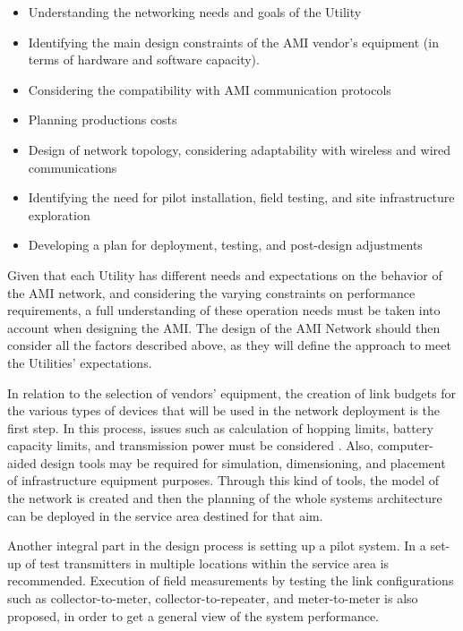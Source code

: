 \documentclass[11pt,draftclsnofoot,onecolumn]{IEEEtran}
\begin{document}
\begin{itemize}
\item Understanding the networking needs and goals of the Utility
\item Identifying the main design constraints of the AMI vendor's equipment (in terms of hardware and software capacity).
\item Considering the compatibility with AMI communication protocols
\item Planning productions costs
\item Design of network topology, considering adaptability with wireless and wired communications
\item Identifying the need for pilot installation, field testing, and site infrastructure exploration
\item Developing a plan for deployment, testing, and post-design adjustments


\end{itemize}
		
Given that each Utility has different needs and expectations on the behavior of the AMI network, and considering the varying constraints on performance requirements, a full understanding of these operation needs must be taken into account when designing the AMI. The design of the AMI Network should then consider all the factors described above, as they will define the approach to meet the Utilities' expectations.

In relation to the selection of vendors' equipment, the creation of link budgets for the various types of devices that will be used in the network deployment is the first step. In this process, issues such as calculation of hopping limits, battery capacity limits, and transmission power must be considered \cite{Leon2011}. Also, computer-aided design tools may be required for simulation, dimensioning, and placement of infrastructure equipment purposes.  Through this kind of tools, the model of the network is created and then the planning of the whole systems architecture can be deployed in the service area destined for that aim.

Another integral part in the design process is setting up a pilot system. In \cite{Leon2011}  a set-up of test transmitters in multiple locations within the service area is recommended. Execution of field measurements by testing the link configurations such as collector-to-meter, collector-to-repeater, and meter-to-meter is also proposed, in order to get a general view of the system performance.  
\end{document}
